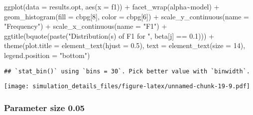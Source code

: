 \documentclass[
]{article}
\newenvironment{Shaded}{\begin{snugshade}}{\end{snugshade}}
\newcommand{\AttributeTok}[1]{\textcolor[rgb]{0.77,0.63,0.00}{#1}}
\newcommand{\DecValTok}[1]{\textcolor[rgb]{0.00,0.00,0.81}{#1}}
\newcommand{\FloatTok}[1]{\textcolor[rgb]{0.00,0.00,0.81}{#1}}
\newcommand{\FunctionTok}[1]{\textcolor[rgb]{0.00,0.00,0.00}{#1}}
\newcommand{\NormalTok}[1]{#1}
\newcommand{\SpecialCharTok}[1]{\textcolor[rgb]{0.00,0.00,0.00}{#1}}
\newcommand{\StringTok}[1]{\textcolor[rgb]{0.31,0.60,0.02}{#1}}
\begin{document}
\begin{Shaded}
\begin{Highlighting}[]
\FunctionTok{ggplot}\NormalTok{(}\AttributeTok{data =}\NormalTok{ results.opt,}
       \FunctionTok{aes}\NormalTok{(}\AttributeTok{x =}\NormalTok{ f1)) }\SpecialCharTok{+}
  \FunctionTok{facet\_wrap}\NormalTok{(alpha}\SpecialCharTok{\textasciitilde{}}\NormalTok{model) }\SpecialCharTok{+}
  \FunctionTok{geom\_histogram}\NormalTok{(}\AttributeTok{fill =}\NormalTok{ cbpg[}\DecValTok{8}\NormalTok{], }\AttributeTok{color =}\NormalTok{ cbpg[}\DecValTok{6}\NormalTok{]) }\SpecialCharTok{+}
  \FunctionTok{scale\_y\_continuous}\NormalTok{(}\AttributeTok{name =} \StringTok{"Frequency"}\NormalTok{) }\SpecialCharTok{+}
  \FunctionTok{scale\_x\_continuous}\NormalTok{(}\AttributeTok{name =} \StringTok{"F1"}\NormalTok{) }\SpecialCharTok{+}
  \FunctionTok{ggtitle}\NormalTok{(}\FunctionTok{bquote}\NormalTok{(}\FunctionTok{paste}\NormalTok{(}\StringTok{"Distribution(s) of F1 for "}\NormalTok{, beta[j] }\SpecialCharTok{==} \FloatTok{0.1}\NormalTok{))) }\SpecialCharTok{+}
  \FunctionTok{theme}\NormalTok{(}\AttributeTok{plot.title =} \FunctionTok{element\_text}\NormalTok{(}\AttributeTok{hjust =} \FloatTok{0.5}\NormalTok{), }
        \AttributeTok{text =} \FunctionTok{element\_text}\NormalTok{(}\AttributeTok{size =} \DecValTok{14}\NormalTok{),}
        \AttributeTok{legend.position =} \StringTok{"bottom"}\NormalTok{)}
\end{Highlighting}
\end{Shaded}

\begin{verbatim}
## `stat_bin()` using `bins = 30`. Pick better value with `binwidth`.
\end{verbatim}

\texttt{[image: simulation\_details\_files/figure-latex/unnamed-chunk-19-9.pdf]}

\hypertarget{parameter-size-0.05}{%
\subsubsection{Parameter size 0.05}\label{parameter-size-0.05}}
\end{document}
